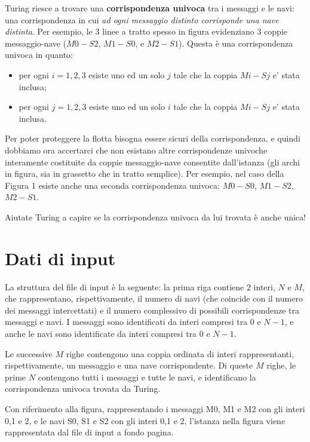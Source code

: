 \documentclass[a4paper,11pt]{article}
\begin{document}
    
Turing riesce a trovare una \textbf{corrispondenza univoca} tra i
messaggi e le navi: una corrispondenza in cui \emph{ad ogni messaggio
distinto corrisponde una nave distinta}. Per esempio, le 3 linee a
tratto spesso in figura evidenziano 3 coppie messaggio-nave ($M0-S2$,
$M1-S0$, e $M2-S1$).  Questa è una corrispondenza univoca in quanto:

\begin{itemize}
  \item per ogni $i=1,2,3$ esiste uno ed un solo $j$ tale che la coppia $Mi-Sj$ e' stata inclusa;
  \item per ogni $j=1,2,3$ esiste uno ed un solo $i$ tale che la coppia $Mi-Sj$ e' stata inclusa.
\end{itemize}

Per poter proteggere la flotta bisogna essere sicuri della
corrispondenza, e quindi dobbiamo ora accertarci che non esistano altre
corrispondenze univoche interamente costituite da coppie messaggio-nave
consentite dall'istanza (gli archi in figura, sia in grassetto che in
tratto semplice).  Per esempio, nel caso della Figura 1 esiste anche una
seconda corrispondenza univoca: $M0-S0$, $M1-S2$, $M2-S1$. 
    
Aiutate Turing a capire se la corrispondenza univoca da lui trovata è
anche unica!

\section*{Dati di input}
  
La struttura del file di input è la seguente: la prima riga contiene $2$
interi, $N$ e $M$, che rappresentano, rispettivamente, il numero di navi
(che coincide con il numero dei messaggi intercettati) e il numero
complessivo di possibili corrispondenze tra messaggi e navi. I messaggi
sono identificati da interi compresi tra $0$ e $N-1$, e anche le navi
sono identificate da interi compresi tra $0$ e $N-1$.

Le successive $M$ righe contengono una coppia ordinata di interi
rappresentanti, rispettivamente, un messaggio e una nave corrispondente.
Di queste $M$ righe, le prime $N$ contengono tutti i messaggi e tutte le
navi, e identificano la corrispondenza univoca trovata da Turing.  
    
Con riferimento alla figura, rappresentando i messaggi M0, M1 e M2 con
gli interi 0,1 e 2, e  le navi S0, S1 e S2 con gli interi 0,1 e 2,
l'istanza nella figura viene rappresentata dal file di input a fondo
pagina.
\end{document}
